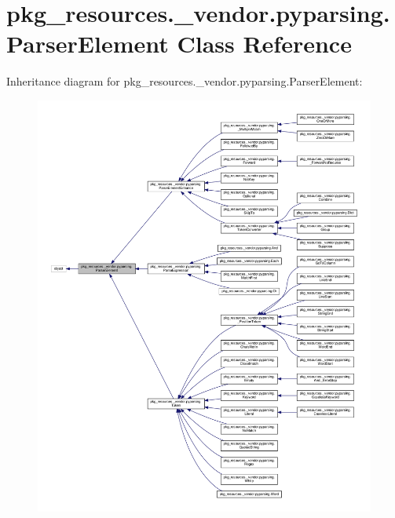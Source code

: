 \hypertarget{classpkg__resources_1_1__vendor_1_1pyparsing_1_1ParserElement}{}\section{pkg\+\_\+resources.\+\_\+vendor.\+pyparsing.\+Parser\+Element Class Reference}
\label{classpkg__resources_1_1__vendor_1_1pyparsing_1_1ParserElement}


Inheritance diagram for pkg\+\_\+resources.\+\_\+vendor.\+pyparsing.\+Parser\+Element\+:
\nopagebreak
\begin{figure}[H]
\begin{center}
\leavevmode
\includegraphics[width=350pt]{classpkg__resources_1_1__vendor_1_1pyparsing_1_1ParserElement__inherit__graph}
\end{center}
\end{figure}


